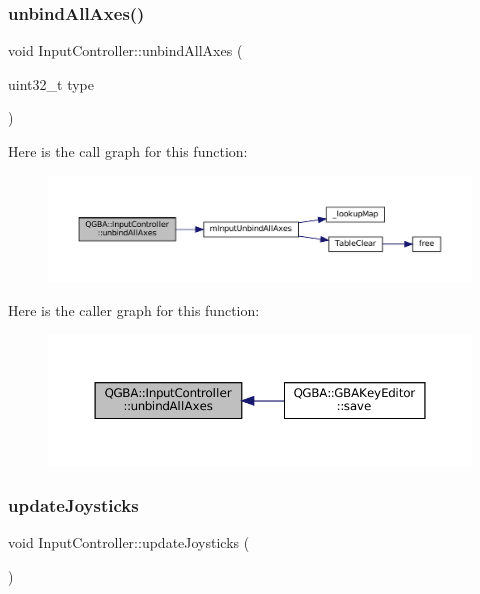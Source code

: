 \subsubsection{\texorpdfstring{unbind\+All\+Axes()}{unbindAllAxes()}}
{\footnotesize\ttfamily void Input\+Controller\+::unbind\+All\+Axes (\begin{DoxyParamCaption}\item[{uint32\+\_\+t}]{type }\end{DoxyParamCaption})}

Here is the call graph for this function\+:
\nopagebreak
\begin{figure}[H]
\begin{center}
\leavevmode
\includegraphics[width=350pt]{class_q_g_b_a_1_1_input_controller_a2f6fe03cf89c5336efe121c65c95309e_cgraph}
\end{center}
\end{figure}
Here is the caller graph for this function\+:
\nopagebreak
\begin{figure}[H]
\begin{center}
\leavevmode
\includegraphics[width=350pt]{class_q_g_b_a_1_1_input_controller_a2f6fe03cf89c5336efe121c65c95309e_icgraph}
\end{center}
\end{figure}
\mbox{\label{class_q_g_b_a_1_1_input_controller_aa8a9042a903f7e1204b1207ecdcb0f73}} 
\subsubsection{\texorpdfstring{update\+Joysticks}{updateJoysticks}}
{\footnotesize\ttfamily void Input\+Controller\+::update\+Joysticks (\begin{DoxyParamCaption}{ }\end{DoxyParamCaption})\hspace{0.3cm}{\ttfamily [slot]}}

